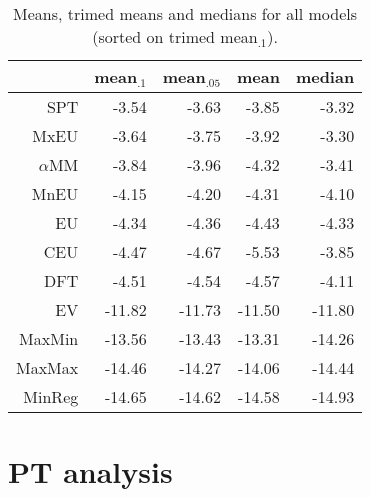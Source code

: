 \documentclass[a4paper]{article}\usepackage[]{graphicx}\usepackage[]{color}
\begin{document}
\begin{table}[!htb]
\centering
\begin{tabular}{rrrrr}
  \hline
 & mean$_{.1}$ & mean$_{.05}$ & mean & median \\ 
  \hline
SPT & -3.54 & -3.63 & -3.85 & -3.32 \\ 
  MxEU & -3.64 & -3.75 & -3.92 & -3.30 \\ 
  $\alpha$MM & -3.84 & -3.96 & -4.32 & -3.41 \\ 
  MnEU & -4.15 & -4.20 & -4.31 & -4.10 \\ 
  EU & -4.34 & -4.36 & -4.43 & -4.33 \\ 
  CEU & -4.47 & -4.67 & -5.53 & -3.85 \\ 
  DFT & -4.51 & -4.54 & -4.57 & -4.11 \\ 
  EV & -11.82 & -11.73 & -11.50 & -11.80 \\ 
  MaxMin & -13.56 & -13.43 & -13.31 & -14.26 \\ 
  MaxMax & -14.46 & -14.27 & -14.06 & -14.44 \\ 
  MinReg & -14.65 & -14.62 & -14.58 & -14.93 \\ 
   \hline
\end{tabular}
\caption{Means, trimed means and medians for all models (sorted on trimed mean$_{.1}$).} 
\label{table4_all_models_means}
\end{table}


\clearpage
\section{PT analysis}
\label{sec:pt-analysis}
\end{document}
